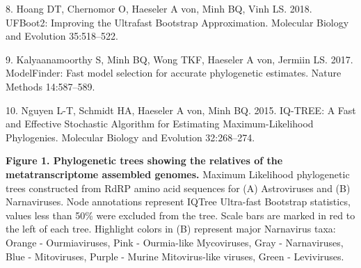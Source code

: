 \documentclass[
  11pt,
]{article}
\begin{document}
\leavevmode\hypertarget{ref-hoang_ufboot2:_2018}{}%
8. Hoang DT, Chernomor O, Haeseler A von, Minh BQ, Vinh LS. 2018.
UFBoot2: Improving the Ultrafast Bootstrap Approximation. Molecular
Biology and Evolution 35:518--522.

\leavevmode\hypertarget{ref-kalyaanamoorthy_modelfinder:_2017}{}%
9. Kalyaanamoorthy S, Minh BQ, Wong TKF, Haeseler A von, Jermiin LS.
2017. ModelFinder: Fast model selection for accurate phylogenetic
estimates. Nature Methods 14:587--589.

\leavevmode\hypertarget{ref-nguyen_iq-tree:_2015}{}%
10. Nguyen L-T, Schmidt HA, Haeseler A von, Minh BQ. 2015. IQ-TREE: A
Fast and Effective Stochastic Algorithm for Estimating
Maximum-Likelihood Phylogenies. Molecular Biology and Evolution
32:268--274.

\newpage

\textbf{Figure 1. Phylogenetic trees showing the relatives of the
metatranscriptome assembled genomes.} Maximum Likelihood phylogenetic
trees constructed from RdRP amino acid sequences for (A) Astroviruses
and (B) Narnaviruses. Node annotations represent IQTree Ultra-fast
Bootstrap statistics, values less than 50\% were excluded from the tree.
Scale bars are marked in red to the left of each tree. Highlight colors
in (B) represent major Narnavirus taxa: Orange - Ourmiaviruses, Pink -
Ourmia-like Mycoviruses, Gray - Narnaviruses, Blue - Mitoviruses, Purple
- Murine Mitovirus-like viruses, Green - Leviviruses.
\end{document}
